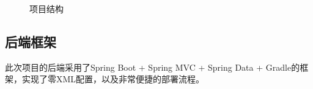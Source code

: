\documentclass[11pt]{article}
\begin{document}
\begin{figure}[h]
    \centering 
    \caption{项目结构} 
    \label{fig:structure}
\end{figure}

\subsection{后端框架}
此次项目的后端采用了Spring Boot + Spring MVC + Spring Data + Gradle的框架，实现了零XML配置，以及非常便捷的部署流程。
\end{document}

